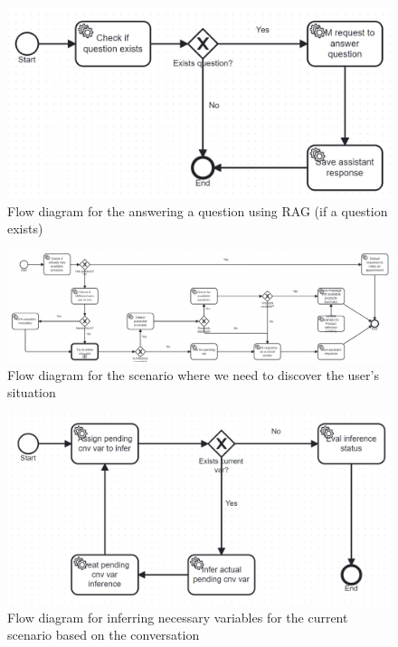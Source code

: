 \documentclass[a4paper,12pt,twoside]{ThesisStyle}
\begin{document}
\begin{figure}[H]
  \centering
  \includegraphics[width=1\textwidth]{img/Answer_question_if_exists.bpmn20.png}
  \caption{Flow diagram for the answering a question using RAG (if a question exists)}
  \label{fig:answerragquestionifexists}
\end{figure}

\begin{figure}[H]
  \centering
  \includegraphics[width=1\textwidth]{img/Situation_discovery_scenario.bpmn20.png}
  \caption{Flow diagram for the scenario where we need to discover the user's situation}
  \label{fig:executesituationdiscoveryscenario}
\end{figure}

\begin{figure}[H]
  \centering
  \includegraphics[width=1\textwidth]{img/Infere_conversation_variables.bpmn20.png}
  \caption{Flow diagram for inferring necessary variables for the current scenario based on the conversation}
  \label{fig:infervariablesprocess}
\end{figure}
\end{document}

